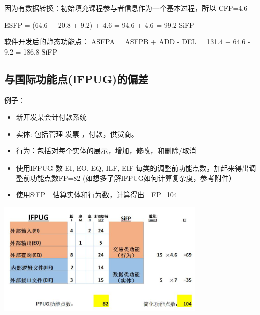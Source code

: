 \begin{description}
\item[]
\end{description}

因为有数据转换：初始填充课程参与者信息作为一个基本过程，所以 CFP=4.6

\begin{description}
\tightlist
\item[]
ESFP = (64.6 + 20.8 + 9.2) + 4.6 = 94.6 + 4.6 = 99.2 SiFP
\end{description}

软件开发后的静态功能点： ASFPA = ASFPB + ADD - DEL = 131.4 + 64.6 - 9.2
= 186.8 SiFP


\hypertarget{ux4e0eux56fdux9645ux529fux80fdux70b9ifpugux7684ux504fux5dee}{%
\subsection{与国际功能点(IFPUG)的偏差}\label{ux4e0eux56fdux9645ux529fux80fdux70b9ifpugux7684ux504fux5dee}}

例子：

\begin{itemize}
\tightlist
\item
  新开发某会计付款系统
\item
  实体: 包括管理 发票 ，付款，供货商。
\item
  行为：包括对每个实体的展示，增加，修改，和删除/取消
\item
  使用IFPUG 数 EI, EO, EQ, ILF, EIF
  每类的调整前功能点数，加起来得出调整前功能点数FP=82
  (如想多了解IFPUG如何计算复杂度，参考附件）
\item
  使用SiFP　估算实体和行为数，计算得出　FP=104
\end{itemize}


\includegraphics[width=10cm]{FPAS11.jpg}

